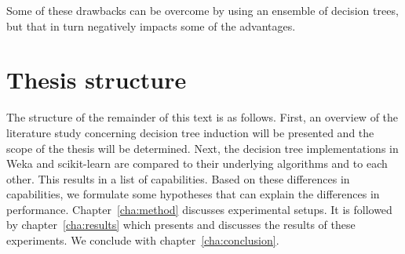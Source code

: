 Some of these drawbacks can be overcome by using an ensemble of decision trees, but that in turn negatively impacts some of the advantages.


\section{Thesis structure}
The structure of the remainder of this text is as follows. First, an overview of the literature study concerning decision tree induction will be presented and the scope of the thesis will be determined. Next, the decision tree implementations in Weka and scikit-learn are compared to their underlying algorithms and to each other. This results in a list of capabilities. Based on these differences in capabilities, we formulate some hypotheses that can explain the differences in performance. Chapter~\ref{cha:method} discusses experimental setups. It is followed by chapter~\ref{cha:results} which presents and discusses the results of these experiments. We conclude with chapter~\ref{cha:conclusion}.
